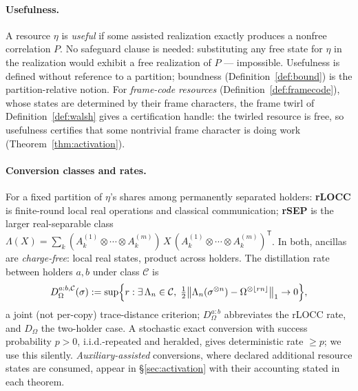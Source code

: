 \documentclass[11pt]{article}
\theoremstyle{plain}
\theoremstyle{definition}
\theoremstyle{remark}
\theoremstyle{plain}
\newcommand{\Om}{\Omega}
\begin{document}
\paragraph{Usefulness.} A resource $\eta$ is \emph{useful} if some
assisted realization exactly produces a nonfree correlation $P$.
No safeguard clause is needed: substituting any free state for
$\eta$ in the realization would exhibit a free realization of $P$
--- impossible. Usefulness is defined without reference to a
partition; boundness (Definition~\ref{def:bound}) is the
partition-relative notion. For \emph{frame-code resources}
(Definition~\ref{def:framecode}), whose states are determined by
their frame characters, the frame twirl of
Definition~\ref{def:walsh} gives a certification handle: the
twirled resource is free, so usefulness certifies that some
nontrivial frame character is doing work
(Theorem~\ref{thm:activation}).

\paragraph{Conversion classes and rates.} For a fixed partition of
$\eta$'s shares among permanently separated holders:
\textbf{rLOCC} is finite-round local real operations and classical
communication; \textbf{rSEP} is the larger real-separable class
$\Lambda(X) = \sum_k(A^{(1)}_k\otimes\cdots\otimes A^{(m)}_k)\,X\,
(A^{(1)}_k\otimes\cdots\otimes A^{(m)}_k)^{\mathsf T}$. In both,
ancillas are \emph{charge-free}: local real states, product across
holders. The distillation rate between holders $a,b$ under class
$\mathcal C$ is
\[
D^{a:b,\mathcal C}_\Om(\sigma)
:= \sup\Bigl\{r : \exists\,\Lambda_n\in\mathcal C,\;
\tfrac12\bigl\|\Lambda_n(\sigma^{\otimes n})
-\Om^{\otimes\lfloor rn\rfloor}\bigr\|_1\to0\Bigr\},
\]
a joint (not per-copy) trace-distance criterion; $D^{a:b}_\Om$
abbreviates the rLOCC rate, and $D_\Om$ the two-holder case. A
stochastic exact conversion with success probability $p>0$,
i.i.d.-repeated and heralded, gives deterministic rate $\ge p$;
we use this silently. \emph{Auxiliary-assisted} conversions,
where declared additional resource states are consumed, appear
in \S\ref{sec:activation} with their accounting stated in each
theorem.
\end{document}
